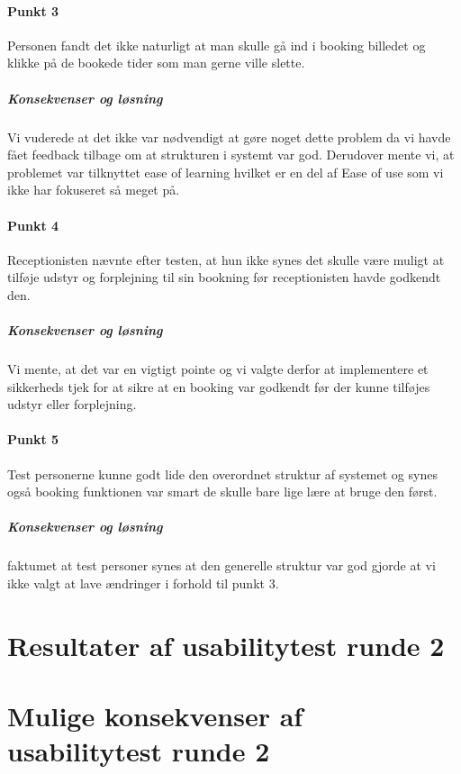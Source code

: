 \paragraph{Punkt 3}
Personen fandt det ikke naturligt at man skulle gå ind i booking billedet og klikke på de bookede tider som man gerne ville slette.
\subparagraph{Konsekvenser og løsning}
Vi vuderede at det ikke var nødvendigt at gøre noget dette problem da vi havde fået feedback tilbage om at strukturen i systemt var god. Derudover mente vi, at problemet var tilknyttet ease of learning hvilket er en del af Ease of use som vi ikke har fokuseret så meget på.

\paragraph{Punkt 4}
Receptionisten nævnte efter testen, at hun ikke synes det skulle være muligt at tilføje udstyr og forplejning til sin bookning før receptionisten havde godkendt den. 
\subparagraph{Konsekvenser og løsning}
Vi mente, at det var en vigtigt pointe og vi valgte derfor at implementere et sikkerheds tjek for at sikre at en booking var godkendt før der kunne tilføjes udstyr eller forplejning.

\paragraph{Punkt 5}
Test personerne kunne godt lide den overordnet struktur af systemet og synes også booking funktionen var smart de skulle bare lige lære at bruge den først.
\subparagraph{Konsekvenser og løsning}
faktumet at test personer synes at den generelle struktur var god gjorde at vi ikke valgt at lave ændringer i forhold til punkt 3.

\section{Resultater af usabilitytest runde 2}
\section{Mulige konsekvenser af usabilitytest runde 2}